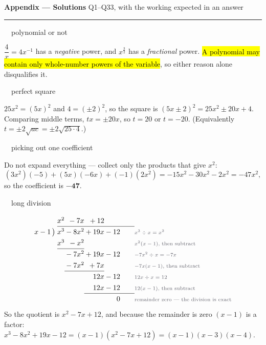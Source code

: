 \documentclass[11pt]{article}
\newcommand{\key}[1]{\hl{#1}}
\newcommand{\solhead}[2]{\medskip{\color{lilacdeep}\bfseries Q#1.}\ \ {\color{greyish}\footnotesize #2}\par\nobreak}
\newcommand{\dstep}[1]{\text{\normalfont\scriptsize\color{greyish}#1}}
\begin{document}

{\color{lilacdeep}\large\bfseries Appendix --- Solutions}\hfill
{\color{greyish}\footnotesize Q1--Q33, with the working expected in an answer}\\[-5pt]

\textcolor{lilacline}{\rule{\textwidth}{0.9pt}}

\solhead{1}{polynomial or not}
$\dfrac4x=4x^{-1}$ has a \emph{negative} power, and $x^{\frac32}$ has a \emph{fractional} power.
\key{A polynomial may contain only whole-number powers of the variable}, so either reason alone disqualifies it.

\solhead{2}{perfect square}
$25x^{2}=(5x)^{2}$ and $4=(\pm2)^{2}$, so the square is $(5x\pm2)^{2}=25x^{2}\pm20x+4$.
Comparing middle terms, $tx=\pm20x$, so $t=20$ or $t=-20$. (Equivalently $t=\pm2\sqrt{ac}=\pm2\sqrt{25\cdot4}$.)

\solhead{3}{picking out one coefficient}
Do not expand everything --- collect only the products that give $x^{2}$:
\[(3x^{2})(-5)+(5x)(-6x)+(-1)(2x^{2})=-15x^{2}-30x^{2}-2x^{2}=-47x^{2},\]
so the coefficient is $\mathbf{-47}$.

\solhead{4}{long division}
\[\renewcommand{\arraystretch}{1.3}\setlength{\arraycolsep}{0.17em}
\begin{array}{r@{\;}r@{}r@{}r@{}r@{\qquad}l}
            & x^{2}      & {}-7x      & {}+12  &        & \\ \cline{2-5}
 x-1\,\big) & x^{3}      & {}-8x^{2}  & {}+19x & {}-12  & \dstep{$x^{3}\div x=x^{2}$}\\
            & x^{3}      & {}-x^{2}   &        &        & \dstep{$x^{2}(x-1)$, then subtract}\\ \cline{2-3}
            &            & {}-7x^{2}  & {}+19x & {}-12  & \dstep{$-7x^{2}\div x=-7x$}\\
            &            & {}-7x^{2}  & {}+7x  &        & \dstep{$-7x(x-1)$, then subtract}\\ \cline{3-4}
            &            &            & 12x    & {}-12  & \dstep{$12x\div x=12$}\\
            &            &            & 12x    & {}-12  & \dstep{$12(x-1)$, then subtract}\\ \cline{4-5}
            &            &            &        & 0      & \dstep{remainder zero --- the division is exact}
\end{array}\]
So the quotient is $x^{2}-7x+12$, and because the remainder is zero $(x-1)$ is a factor:
$x^{3}-8x^{2}+19x-12=(x-1)(x^{2}-7x+12)=(x-1)(x-3)(x-4)$.
\end{document}
